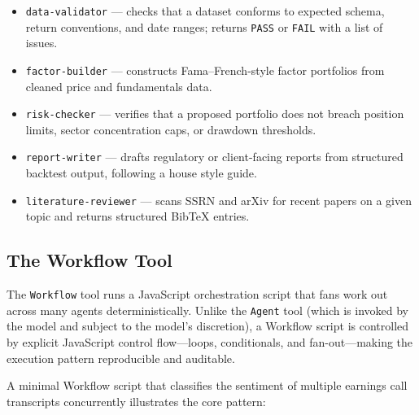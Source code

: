 \begin{itemize}
  \item \texttt{data-validator} --- checks that a dataset conforms to expected
        schema, return conventions, and date ranges; returns \texttt{PASS} or
        \texttt{FAIL} with a list of issues.
  \item \texttt{factor-builder} --- constructs Fama--French-style factor
        portfolios from cleaned price and fundamentals data.
  \item \texttt{risk-checker} --- verifies that a proposed portfolio does not
        breach position limits, sector concentration caps, or drawdown thresholds.
  \item \texttt{report-writer} --- drafts regulatory or client-facing reports
        from structured backtest output, following a house style guide.
  \item \texttt{literature-reviewer} --- scans SSRN and arXiv for recent papers
        on a given topic and returns structured BibTeX entries.
\end{itemize}

\subsection{The Workflow Tool}
\label{app:claude-code:workflow}

The \texttt{Workflow} tool runs a JavaScript orchestration script that fans
work out across many agents deterministically.  Unlike the \texttt{Agent} tool
(which is invoked by the model and subject to the model's discretion), a
Workflow script is controlled by explicit JavaScript control flow---loops,
conditionals, and fan-out---making the execution pattern reproducible and
auditable.

A minimal Workflow script that classifies the sentiment of multiple earnings
call transcripts concurrently illustrates the core pattern:

